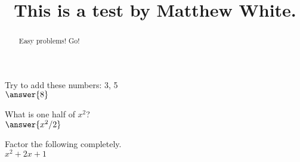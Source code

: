 \documentclass{ximera}
\title{This is a test by Matthew White.}
\begin{document}
	\begin{abstract}
		Easy problems! Go!
	\end{abstract}
	\maketitle
	
	
\begin{question}
	Try to add these numbers: 3, 5\\
	$\answer{8}$
\end{question}
	
	\begin{question}
		What is one half of $x^2$?\\
		$	\answer{x^2/2}$
	\end{question}
	
	\begin{question}
	Factor the following completely.\\
	$ x^2 + 2x + 1 $
	\begin{multipleChoice}
	\end{multipleChoice}
	\end{question}
	
\end{document}
